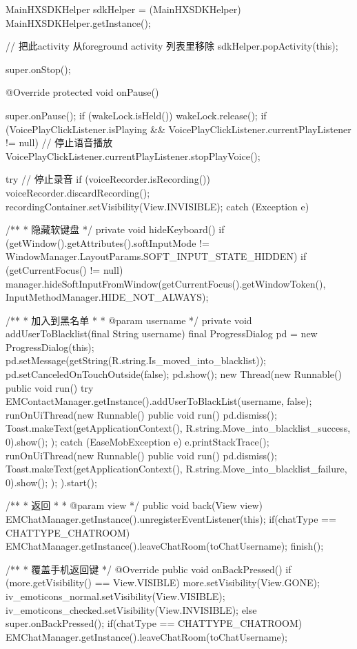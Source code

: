 {{		MainHXSDKHelper sdkHelper = (MainHXSDKHelper) MainHXSDKHelper.getInstance();

		// 把此activity 从foreground activity 列表里移除
		sdkHelper.popActivity(this);
		
		super.onStop();
	}

	@Override
	protected void onPause() {
		super.onPause();
		if (wakeLock.isHeld())
			wakeLock.release();
		if (VoicePlayClickListener.isPlaying && VoicePlayClickListener.currentPlayListener != null) {
			// 停止语音播放
			VoicePlayClickListener.currentPlayListener.stopPlayVoice();
		}

		try {
			// 停止录音
			if (voiceRecorder.isRecording()) {
				voiceRecorder.discardRecording();
				recordingContainer.setVisibility(View.INVISIBLE);
			}
		} catch (Exception e) {
		}
	}

	/**
	 * 隐藏软键盘
	 */
	private void hideKeyboard() {
		if (getWindow().getAttributes().softInputMode != WindowManager.LayoutParams.SOFT_INPUT_STATE_HIDDEN) {
			if (getCurrentFocus() != null)
				manager.hideSoftInputFromWindow(getCurrentFocus().getWindowToken(), InputMethodManager.HIDE_NOT_ALWAYS);
		}
	}

	/**
	 * 加入到黑名单
	 * 
	 * @param username
	 */
	private void addUserToBlacklist(final String username) {
		final ProgressDialog pd = new ProgressDialog(this);
		pd.setMessage(getString(R.string.Is_moved_into_blacklist));
		pd.setCanceledOnTouchOutside(false);
		pd.show();
		new Thread(new Runnable() {
			public void run() {
				try {
					EMContactManager.getInstance().addUserToBlackList(username, false);
					runOnUiThread(new Runnable() {
						public void run() {
							pd.dismiss();
							Toast.makeText(getApplicationContext(), R.string.Move_into_blacklist_success, 0).show();
						}
					});
				} catch (EaseMobException e) {
					e.printStackTrace();
					runOnUiThread(new Runnable() {
						public void run() {
							pd.dismiss();
							Toast.makeText(getApplicationContext(), R.string.Move_into_blacklist_failure, 0).show();
						}
					});
				}
			}
		}).start();
	}

	/**
	 * 返回
	 * 
	 * @param view
	 */
	public void back(View view) {
		EMChatManager.getInstance().unregisterEventListener(this);
		if(chatType == CHATTYPE_CHATROOM){
			EMChatManager.getInstance().leaveChatRoom(toChatUsername);
		}
		finish();
	}

	/**
	 * 覆盖手机返回键
	 */
	@Override
	public void onBackPressed() {
		if (more.getVisibility() == View.VISIBLE) {
			more.setVisibility(View.GONE);
			iv_emoticons_normal.setVisibility(View.VISIBLE);
			iv_emoticons_checked.setVisibility(View.INVISIBLE);
		} else {
			super.onBackPressed();
			if(chatType == CHATTYPE_CHATROOM){
				EMChatManager.getInstance().leaveChatRoom(toChatUsername);
			}
		}
	}

}
